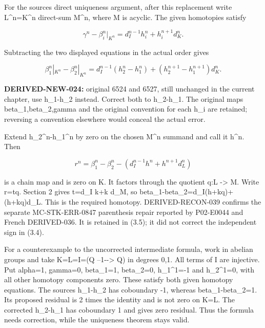 For the source\textquotesingle s direct uniqueness argument,\allowbreak{} after this replacement write L\textasciicircum{}n\allowbreak{}=K\textasciicircum{}n direct-sum M\textasciicircum{}n,\allowbreak{} where M is acyclic. The given homotopies satisfy

\[
 \gamma^n-\beta_i^n|_{K^n}
       =d_I^{n-1}h_i^n+h_i^{n+1}d_K^n.
\]

Subtracting the two displayed equations in the actual order gives

\[
 \beta_1^n|_{K^n}-\beta_2^n|_{K^n}
 =d_I^{n-1}(h_2^n-h_1^n)
                  +(h_2^{n+1}-h_1^{n+1})d_K^n.          \tag{3.4}
\]

\textbf{DERIVED-NEW-024:\allowbreak{}} original 6524 and 6527,\allowbreak{} still unchanged in the current chapter,\allowbreak{} use h\_\allowbreak{}1-h\_\allowbreak{}2 instead. Correct both to h\_\allowbreak{}2-h\_\allowbreak{}1. The original maps beta\_\allowbreak{}1,\allowbreak{}beta\_\allowbreak{}2,\allowbreak{}gamma and the original convention for each h\_\allowbreak{}i are retained; reversing a convention elsewhere would conceal the actual error.

Extend h\_\allowbreak{}2\textasciicircum{}n-h\_\allowbreak{}1\textasciicircum{}n by zero on the chosen M\^{}n summand and call it h\^{}n. Then

\[
 r^n=\beta_1^n-\beta_2^n
                -(d_I^{n-1}h^n+h^{n+1}d_L^n)            \tag{3.5}
\]

is a chain map and is zero on K. It factors through the quotient q:\allowbreak{}L \allowbreak{}-> M. Write r\allowbreak{}=tq. Section 2 gives t\allowbreak{}=d\_\allowbreak{}I k\allowbreak{}+k d\_\allowbreak{}M,\allowbreak{} so beta\_\allowbreak{}1-beta\_\allowbreak{}2\allowbreak{}=d\_\allowbreak{}I(h\allowbreak{}+kq)\allowbreak{}\allowbreak{}+(h\allowbreak{}+kq)\allowbreak{}d\_\allowbreak{}L. This is the required homotopy. DERIVED-RECON-039 confirms the separate MC-STK-ERR-0847 parenthesis repair reported by P02-E0044 and French DERIVED-036. It is retained in (3.5)\allowbreak{}; it did not correct the independent sign in (3.4)\allowbreak{}.

For a counterexample to the uncorrected intermediate formula,\allowbreak{} work in abelian groups and take K\allowbreak{}=L\allowbreak{}=I\allowbreak{}=(Q --1-\allowbreak{}-> Q)\allowbreak{} in degrees 0,\allowbreak{}1. All terms of I are injective. Put alpha\allowbreak{}=1,\allowbreak{} gamma\allowbreak{}=0,\allowbreak{} beta\_\allowbreak{}1\allowbreak{}=1,\allowbreak{} beta\_\allowbreak{}2\allowbreak{}=0,\allowbreak{} h\_\allowbreak{}1\textasciicircum{}1\allowbreak{}=-1 and h\_\allowbreak{}2\textasciicircum{}1\allowbreak{}=0,\allowbreak{} with all other homotopy components zero. These satisfy both given homotopy equations. The source\textquotesingle s h\_\allowbreak{}1-h\_\allowbreak{}2 has coboundary -1,\allowbreak{} whereas beta\_\allowbreak{}1-beta\_\allowbreak{}2\allowbreak{}=1. Its proposed residual is 2 times the identity and is not zero on K\allowbreak{}=L. The corrected h\_\allowbreak{}2-h\_\allowbreak{}1 has coboundary 1 and gives zero residual. Thus the formula needs correction,\allowbreak{} while the uniqueness theorem stays valid.

